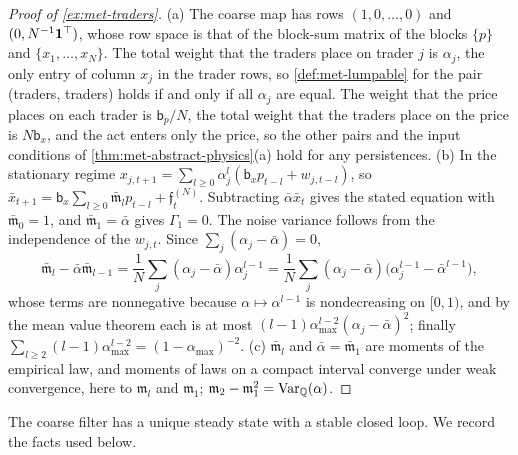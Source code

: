 \begin{proof}[Proof of \cref{ex:met-traders}]
(a) The coarse map has rows $(1,0,\dots,0)$ and $(0,N^{-1}\mathbf{1}^\top)$, whose row space is that of the block-sum matrix of the blocks $\{p\}$ and $\{x_1,\dots,x_N\}$. The total weight that the traders place on trader $j$ is $\alpha_j$, the only entry of column $x_j$ in the trader rows, so \cref{def:met-lumpable} for the pair (traders, traders) holds if and only if all $\alpha_j$ are equal. The weight that the price places on each trader is $\mathsf b_p/N$, the total weight that the traders place on the price is $N\mathsf b_x$, and the act enters only the price, so the other pairs and the input conditions of \cref{thm:met-abstract-physics}(a) hold for any persistences. (b) In the stationary regime $x_{j,t+1}=\sum_{l\ge0}\alpha_j^l(\mathsf b_xp_{t-l}+w_{j,t-l})$, so $\bar x_{t+1}=\mathsf b_x\sum_{l\ge0}\bar{\mathfrak m}_lp_{t-l}+\mathfrak f^{(N)}_t$. Subtracting $\bar\alpha\bar x_t$ gives the stated equation with $\bar{\mathfrak m}_0=1$, and $\bar{\mathfrak m}_1=\bar\alpha$ gives $\Gamma_1=0$. The noise variance follows from the independence of the $w_{j,t}$. Since $\sum_j(\alpha_j-\bar\alpha)=0$,
\[
\bar{\mathfrak m}_l-\bar\alpha\bar{\mathfrak m}_{l-1}=\frac1N\sum_j(\alpha_j-\bar\alpha)\alpha_j^{l-1}=\frac1N\sum_j(\alpha_j-\bar\alpha)\bigl(\alpha_j^{l-1}-\bar\alpha^{l-1}\bigr),
\]
whose terms are nonnegative because $\alpha\mapsto\alpha^{l-1}$ is nondecreasing on $[0,1)$, and by the mean value theorem each is at most $(l-1)\alpha_{\max}^{l-2}(\alpha_j-\bar\alpha)^2$; finally $\sum_{l\ge2}(l-1)\alpha_{\max}^{l-2}=(1-\alpha_{\max})^{-2}$. (c) $\bar{\mathfrak m}_l$ and $\bar\alpha=\bar{\mathfrak m}_1$ are moments of the empirical law, and moments of laws on a compact interval converge under weak convergence, here to $\mathfrak m_l$ and $\mathfrak m_1$; $\mathfrak m_2-\mathfrak m_1^2=\operatorname{Var}_{\mathbb Q}(\alpha)$.
\end{proof}

The coarse filter has a unique steady state with a stable closed loop. We record the facts used below.

